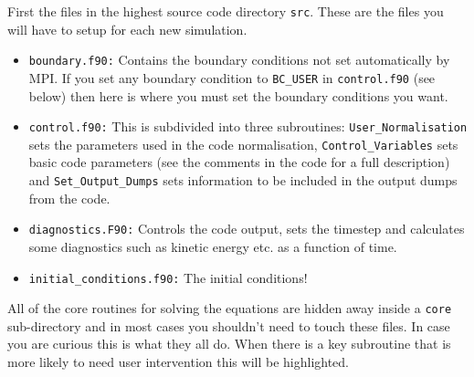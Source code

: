 \documentclass[11pt]{article}
\begin{document}
First the files in the highest source code directory \texttt{src}. These are the files you will have to setup for each 
new simulation.
\begin{itemize}
 \item{\texttt{boundary.f90:}} Contains the boundary conditions not set automatically by MPI. If you set any boundary 
 condition to \texttt{BC\_USER} in \texttt{control.f90} (see below) then here is where you must set the boundary 
 conditions you want.
  \item{\texttt{control.f90:}} This is subdivided into three subroutines: \texttt{User\_Normalisation} sets the 
  parameters used in the code normalisation, \texttt{Control\_Variables} sets basic code parameters  (see the 
  comments in the code for a full description) and
\texttt{Set\_Output\_Dumps} sets information to be included in the output dumps from the code.
 \item{\texttt{diagnostics.F90:}} Controls the code output, sets the timestep and calculates some diagnostics such as 
 kinetic energy etc. as a function of time.
  \item{\texttt{initial\_conditions.f90:}} The initial conditions!
\end{itemize}

All of the core routines for solving the equations are hidden away inside a \texttt{core} sub-directory and in most 
cases you shouldn't need to touch these files. In case you are curious this is what they all do. When there is a key 
subroutine that is more likely to need user intervention this will be highlighted.
\end{document}
